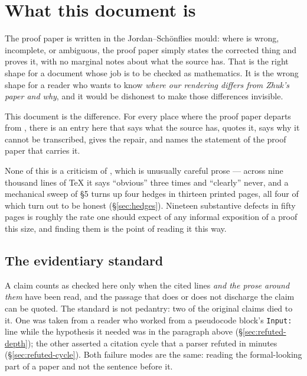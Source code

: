 \section{What this document is}\label{sec:audit-intro}

The proof paper is written in the Jordan--Schönflies mould: where
\cite{ZhukSimplified} is wrong, incomplete, or ambiguous, the proof paper
simply states the corrected thing and proves it, with no marginal notes about
what the source has. That is the right shape for a document whose job is to be
checked as mathematics. It is the wrong shape for a reader who wants to know
\emph{where our rendering differs from Zhuk's paper and why}, and it would be
dishonest to make those differences invisible.

This document is the difference. For every place where the proof paper departs
from \cite{ZhukSimplified}, there is an entry here that says what the source
has, quotes it, says why it cannot be transcribed, gives the repair, and names
the statement of the proof paper that carries it.

None of this is a criticism of \cite{ZhukSimplified}, which is unusually careful
prose --- across nine thousand lines of \TeX{} it says ``obvious'' three times
and ``clearly'' never, and a mechanical sweep of \S5 turns up four hedges in
thirteen printed pages, all four of which turn out to be honest
(\S\ref{sec:hedges}). Nineteen substantive defects in fifty pages is roughly
the rate one should expect of any informal exposition of a proof this size, and
finding them is the point of reading it this way.

\subsection{The evidentiary standard}\label{sec:standard}

A claim counts as checked here only when the cited lines \emph{and the prose
around them} have been read, and the passage that does or does not discharge
the claim can be quoted. The standard is not pedantry: two of the original
claims died to it. One was taken from a reader who worked from a pseudocode
block's \texttt{Input:} line while the hypothesis it needed was in the
paragraph above (\S\ref{sec:refuted-depth}); the other asserted a citation
cycle that a parser refuted in minutes (\S\ref{sec:refuted-cycle}). Both
failure modes are the same: reading the formal-looking part of a paper and not
the sentence before it.

